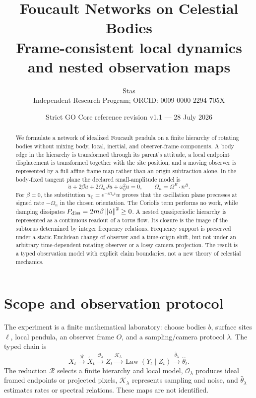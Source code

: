\documentclass[11pt,a4paper]{article}
\title{\bfseries Foucault Networks on Celestial Bodies\\
\large Frame-consistent local dynamics and nested observation maps}
\author{Stas\\
\small Independent Research Program; ORCID: 0009-0000-2294-705X}
\date{Strict GO Core reference revision v1.1 --- 28 July 2026}
\theoremstyle{definition}
\theoremstyle{plain}
\theoremstyle{remark}
\newcommand{\norm}[1]{\left\lVert #1\right\rVert}
\newcommand{\Ocal}{\mathcal O}
\newcommand{\Kcal}{\mathcal K}
\newcommand{\Rcal}{\mathcal R}
\begin{document}
\maketitle

\begin{center}
\end{center}

\begin{abstract}
We formulate a network of idealized Foucault pendula on a finite
hierarchy of rotating bodies without mixing body, local, inertial, and
observer-frame components. A body edge in the hierarchy is transformed
through its parent's attitude, a local endpoint displacement is
transformed together with the site position, and a moving observer is
represented by a full affine frame map rather than an origin
subtraction alone. In the body-fixed tangent plane the declared
small-amplitude model is
\[
\ddot u+2\beta\dot u+2\Omega_nJ\dot u+\omega_0^2u=0,
\qquad \Omega_n=\Omega^B\cdot n^B .
\]
For \(\beta=0\), the substitution
\(u_{\mathbb C}=e^{-i\Omega_nt}w\) proves that the oscillation plane
precesses at signed rate \(-\Omega_n\) in the chosen orientation. The
Coriolis term performs no work, while damping dissipates
\(P_{\rm diss}=2m\beta\norm{\dot u}^2\ge0\). A nested
quasiperiodic hierarchy is represented as a continuous readout of a
torus flow. Its closure is the image of the subtorus determined by
integer frequency relations. Frequency support is preserved under a
static Euclidean change of observer and a time-origin shift, but not
under an arbitrary time-dependent rotating observer or a lossy camera
projection. The result is a typed observation model with explicit
claim boundaries, not a new theory of celestial mechanics.
\end{abstract}

\tableofcontents

\section{Scope and observation protocol}

The experiment is a finite mathematical laboratory: choose bodies
\(b\), surface sites \(\ell\), local pendula, an observer frame \(O\),
and a sampling/camera protocol \(\lambda\). The typed chain is
\[
X_t\xrightarrow{\Rcal}\widetilde X_t
\xrightarrow{\Ocal_\lambda}Z_t
\xrightarrow{\Kcal_\lambda}\operatorname{Law}(Y_t\mid Z_t)
\xrightarrow{\widehat\theta_\lambda}\widehat\theta_t.
\]
The reduction \(\Rcal\) selects a finite hierarchy and local model,
\(\Ocal_\lambda\) produces ideal framed endpoints or projected pixels,
\(\Kcal_\lambda\) represents sampling and noise, and
\(\widehat\theta_\lambda\) estimates rates or spectral relations.
These maps are not identified.
\end{document}
